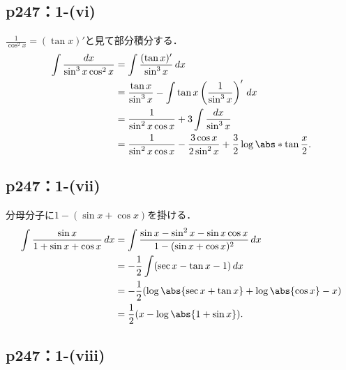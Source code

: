 \documentclass[a4paper,10pt,fleqn]{ltjsarticle}
\begin{document}
\subsection*{p247：1-(vi)}


\begin{leftbar}
    $\frac{1}{\cos^2 x} = (\tan x)'$と見て部分積分する．
    \begin{align*}
        \int \frac{dx}{\sin^3 x \cos^2 x}
         & = \int \frac{(\tan x)'}{\sin^3 x} \,dx                                                                \\
         & = \frac{\tan x}{\sin^3 x} - \int \tan x \left(\frac{1}{\sin^3 x}\right)' \,dx                         \\
         & = \frac{1}{\sin^2 x \cos x} + 3 \int \frac{dx}{\sin^3 x}                                              \\
         & = \frac{1}{\sin^2 x \cos x} - \frac{3 \cos x}{2 \sin^2 x} + \frac{3}{2} \log \abs*{\tan \frac{x}{2}}.
    \end{align*}
\end{leftbar}


\subsection*{p247：1-(vii)}

\begin{leftbar}
    分母分子に$1-(\sin x + \cos x)$を掛ける．
    \begin{align*}
        \int \frac{\sin x}{1 + \sin x + \cos x} \,dx
         & = \int \frac{\sin x - \sin^2 x - \sin x\cos x}{1-(\sin x + \cos x)^2} \,dx \\
         & = -\frac{1}{2} \int (\sec x - \tan x - 1) \,dx                             \\
         & = -\frac{1}{2}(\log \abs{\sec x + \tan x} + \log \abs{\cos x} - x)         \\
         & = \frac{1}{2}(x - \log \abs{1 + \sin x}).
    \end{align*}
\end{leftbar}

\subsection*{p247：1-(viii)}
\end{document}
